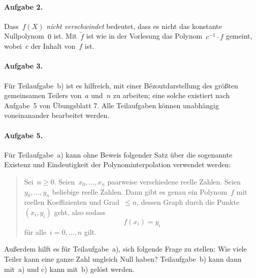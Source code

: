 \documentclass{../algblatt}
\begin{document}
\paragraph{Aufgabe 2.} Dass~$f(X)$ \emph{nicht verschwindet} bedeutet, dass es
nicht das konstante Nullpolynom~$0$ ist. Mit~$\widetilde f$ ist wie in der Vorlesung das
Polynom~$c^{-1} \cdot f$ gemeint, wobei~$c$ der Inhalt von~$f$ ist.

\paragraph{Aufgabe 3.} Für Teilaufgabe~b) ist es hilfreich, mit einer
Bézoutdarstellung des größten gemeinsamen Teilers von~$a$ und~$n$ zu arbeiten;
eine solche existiert nach Aufgabe~5 von Übungsblatt 7. Alle Teilaufgaben
können unabhängig voneinanander bearbeitet werden.

\paragraph{Aufgabe 5.} Für Teilaufgabe~a) kann ohne Beweis folgender Satz
über die sogenannte Existenz und Eindeutigkeit der Polynominterpolation verwendet werden:
\begin{quote}
Sei~$n \geq 0$. Seien~$x_0, \ldots, x_n$ paarweise verschiedene reelle Zahlen. Seien~$y_0,
\ldots, y_n$ beliebige reelle Zahlen. Dann gibt es genau ein Polynom~$f$ mit
reellen Koeffizienten und Grad~$\leq n$, dessen Graph durch die Punkte~$(x_i,
y_i)$ geht, also sodass
\[ f(x_i) = y_i \]
für alle~$i = 0,\ldots,n$ gilt.
\end{quote}
Außerdem hilft es für Teilaufgabe~a), sich
folgende Frage zu stellen: Wie viele Teiler kann eine ganze Zahl ungleich Null
haben?
Teilaufgabe~b) kann dann mit~a) und c) kann mit~b) gelöst werden.
\end{document}
